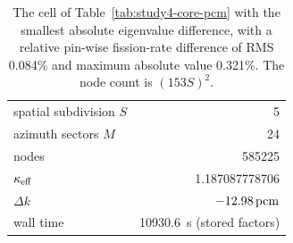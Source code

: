 \begin{table}[htbp]
\centering
\caption{The cell of Table~\ref{tab:study4-core-pcm} with the smallest absolute
eigenvalue difference, with a relative pin-wise fission-rate difference of RMS 0.084\% and maximum absolute value 0.321\%. The node count is $(153S)^2$.}
\label{tab:study4-core-best}
\begin{tabular}{lr}
\hline
spatial subdivision $S$ & 5\\
azimuth sectors $M$ & 24\\
nodes & 585225\\
$\kappa_{\mathrm{eff}}$ & 1.187087778706\\
$\Delta k$ & $-12.98\,\mathrm{pcm}$\\
wall time & 10930.6~s (stored factors)\\
\hline
\end{tabular}
\end{table}
